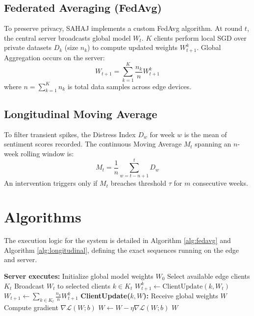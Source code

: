 \documentclass[conference]{IEEEtran}
\begin{document}
\subsection{Federated Averaging (FedAvg)}
To preserve privacy, SAHAJ implements a custom FedAvg algorithm. At round $t$, the central server broadcasts global model $W_t$. $K$ clients perform local SGD over private datasets $D_k$ (size $n_k$) to compute updated weights $W_{t+1}^k$. Global Aggregation occurs on the server:
\begin{equation}
W_{t+1} = \sum_{k=1}^{K} \frac{n_k}{n} W_{t+1}^k
\end{equation}
where $n = \sum_{k=1}^K n_k$ is total data samples across edge devices.

\subsection{Longitudinal Moving Average}
To filter transient spikes, the Distress Index $D_w$ for week $w$ is the mean of sentiment scores recorded. The continuous Moving Average $M_t$ spanning an $n$-week rolling window is:
\begin{equation}
M_t = \frac{1}{n} \sum_{w=t-n+1}^{t} D_w
\end{equation}
An intervention triggers only if $M_t$ breaches threshold $\tau$ for $m$ consecutive weeks.

\section{Algorithms}
The execution logic for the system is detailed in Algorithm \ref{alg:fedavg} and Algorithm \ref{alg:longitudinal}, defining the exact sequences running on the edge and server.

\begin{algorithm}
\caption{Custom Federated Averaging Procedure}\label{alg:fedavg}
\begin{algorithmic}[1]
\STATE \textbf{Server executes:}
\STATE Initialize global model weights $W_0$
    \STATE Select available edge clients $K_t$
    \STATE Broadcast $W_t$ to selected clients $k \in K_t$
        \STATE $W_{t+1}^k \leftarrow \text{ClientUpdate}(k, W_t)$
    \ENDFOR
    \STATE $W_{t+1} \leftarrow \sum_{k \in K_t} \frac{n_k}{n} W_{t+1}^k$
\ENDFOR
\vspace{0.2cm}
\STATE \textbf{ClientUpdate($k, W$):}
\STATE Receive global weights $W$
        \STATE Compute gradient $\nabla \mathcal{L}(W; b)$
        \STATE $W \leftarrow W - \eta \nabla \mathcal{L}(W; b)$
    \ENDFOR
\ENDFOR
\RETURN $W$
\end{algorithmic}
\end{algorithm}
\end{document}
